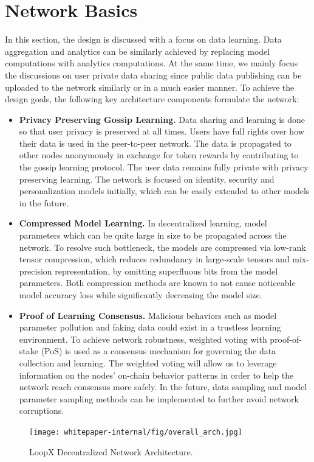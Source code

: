 \documentclass[11pt,letterpaper]{article}
\begin{document}
\section{Network Basics}
In this section, the design is discussed with a focus on data learning. Data aggregation and analytics can be similarly achieved by replacing model computations with analytics computations. At the same time, we mainly focus the discussions on user private data sharing since public data publishing can be uploaded to the network similarly or in a much easier manner.
To achieve the design goals, the following key architecture components formulate the network:
\begin{itemize}
  \item \textbf{Privacy Preserving Gossip Learning.} Data sharing and learning is done so that user privacy is preserved at all times. Users have full rights over how their data is used in the peer-to-peer network. The data is propagated to other nodes anonymously in exchange for token rewards by contributing to the gossip learning protocol. The user data remains fully private with privacy preserving learning. The network is focused on identity, security and personalization models initially, which can be easily extended to other models in the future.
  \item \textbf{Compressed Model Learning.}
  In decentralized learning, model parameters which can be quite large in size to be propagated across the network. To resolve such bottleneck, the models are compressed via low-rank tensor compression, which reduces redundancy in large-scale tensors and mix-precision representation, by omitting superfluous bits from the model parameters. Both compression methods are known to not cause noticeable model accuracy loss while significantly decreasing the model size.
  \item \textbf{Proof of Learning Consensus.} Malicious behaviors such as model parameter pollution and faking data could exist in a trustless learning environment. To achieve network robustness, weighted voting with proof-of-stake (PoS) is used as a consensus mechanism for governing the data collection and learning. The weighted voting will allow us to leverage information on the nodes' on-chain behavior patterns in order to help the network reach consensus more safely. In the future, data sampling and model parameter sampling methods can be implemented to further avoid network corruptions.
\end{itemize}

\begin{figure}[t]
\centering
	\texttt{[image: whitepaper-internal/fig/overall\_arch.jpg]}
\caption{LoopX Decentralized Network Architecture.} 
\label{fig:overall-arch}
\vspace{-2pt}
\end{figure}
\end{document}
